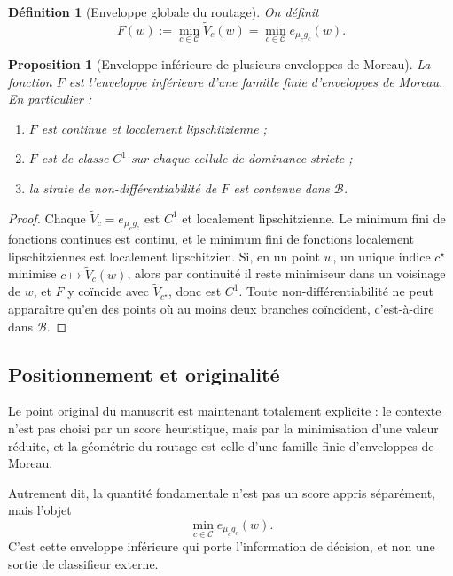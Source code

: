 \documentclass[11pt,a4paper]{article}
\newtheorem{definition}{Définition}[section]
\newtheorem{proposition}{Proposition}[section]
\newcommand{\Ccal}{\mathcal C}
\begin{document}
\begin{definition}[Enveloppe globale du routage]
On définit
\[
F(w):=\min_{c\in\Ccal}\widetilde V_c(w)
=
\min_{c\in\Ccal}e_{\mu_c g_c}(w).
\]
\end{definition}

\begin{proposition}[Enveloppe inférieure de plusieurs enveloppes de Moreau]
La fonction \(F\) est l'enveloppe inférieure d'une famille finie d'enveloppes de Moreau. En particulier :
\begin{enumerate}[leftmargin=2em]
\item \(F\) est continue et localement lipschitzienne ;
\item \(F\) est de classe \(C^1\) sur chaque cellule de dominance stricte ;
\item la strate de non-différentiabilité de \(F\) est contenue dans \(\mathcal B\).
\end{enumerate}
\end{proposition}

\begin{proof}
Chaque \(\widetilde V_c=e_{\mu_c g_c}\) est \(C^1\) et localement lipschitzienne. Le minimum fini de fonctions continues est continu, et le minimum fini de fonctions localement lipschitziennes est localement lipschitzien. Si, en un point \(w\), un unique indice \(c^\star\) minimise \(c\mapsto \widetilde V_c(w)\), alors par continuité il reste minimiseur dans un voisinage de \(w\), et \(F\) y coïncide avec \(\widetilde V_{c^\star}\), donc est \(C^1\). Toute non-différentiabilité ne peut apparaître qu'en des points où au moins deux branches coïncident, c'est-à-dire dans \(\mathcal B\).
\end{proof}

\subsection*{Positionnement et originalité}

Le point original du manuscrit est maintenant totalement explicite : le contexte n'est pas choisi par un score heuristique, mais par la minimisation d'une valeur réduite, et la géométrie du routage est celle d'une famille finie d'enveloppes de Moreau.

Autrement dit, la quantité fondamentale n'est pas un score appris séparément, mais l'objet
\[
\min_{c\in\Ccal} e_{\mu_c g_c}(w).
\]
C'est cette enveloppe inférieure qui porte l'information de décision, et non une sortie de classifieur externe.
\end{document}
